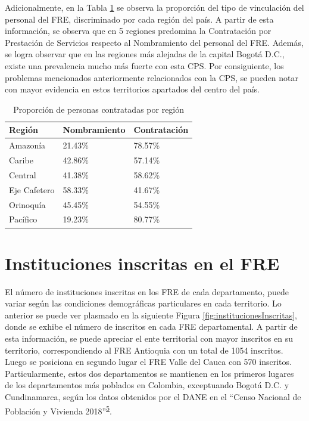 \documentclass[
]{book}
\begin{document}
Adicionalmente, en la Tabla \ref{tab:CaracterizacionIngreso1} se observa la proporción del tipo de vinculación del personal del FRE, discriminado por cada región del país. A partir de esta información, se observa que en 5 regiones predomina la Contratación por Prestación de Servicios respecto al Nombramiento del personal del FRE. Además, se logra observar que en las regiones más alejadas de la capital Bogotá D.C., existe una prevalencia mucho más fuerte con esta CPS. Por consiguiente, los problemas mencionados anteriormente relacionados con la CPS, se pueden notar con mayor evidencia en estos territorios apartados del centro del país.

\begin{table}

\caption{\label{tab:CaracterizacionIngreso1}Proporción de personas contratadas por región}
\centering
\begin{tabular}[t]{lll}
\toprule
Región & Nombramiento & Contratación\\
\midrule
Amazonía & 21.43\% & 78.57\%\\
Caribe & 42.86\% & 57.14\%\\
Central & 41.38\% & 58.62\%\\
Eje Cafetero & 58.33\% & 41.67\%\\
Orinoquía & 45.45\% & 54.55\%\\
\addlinespace
Pacífico & 19.23\% & 80.77\%\\
\bottomrule
\end{tabular}
\end{table}

\hypertarget{instituciones-inscritas-en-el-fre}{%
\section{Instituciones inscritas en el FRE}\label{instituciones-inscritas-en-el-fre}}

El número de instituciones inscritas en los FRE de cada departamento, puede variar según las condiciones demográficas particulares en cada territorio. Lo anterior se puede ver plasmado en la siguiente Figura \ref{fig:institucionesInscritas}, donde se exhibe el número de inscritos en cada FRE departamental. A partir de esta información, se puede apreciar el ente territorial con mayor inscritos en su territorio, correspondiendo al FRE Antioquia con un total de 1054 inscritos. Luego se posiciona en segundo lugar el FRE Valle del Cauca con 570 inscritos. Particularmente, estos dos departamentos se mantienen en los primeros lugares de los departamentos más poblados en Colombia, exceptuando Bogotá D.C. y Cundinamarca, según los datos obtenidos por el DANE en el ``Censo Nacional de Población y Vivienda 2018''\textsuperscript{\protect\hyperlink{ref-DANE2021}{5}}.
\end{document}
